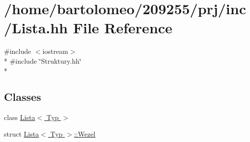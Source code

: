 \hypertarget{_lista_8hh}{\section{/home/bartolomeo/209255/prj/inc/\-Lista.hh File Reference}
\label{_lista_8hh}
}
{\ttfamily \#include $<$iostream$>$}\\*
{\ttfamily \#include \char`\"{}Struktury.\-hh\char`\"{}}\\*
\subsection*{Classes}
\begin{DoxyCompactItemize}
\item 
class \hyperlink{class_lista}{Lista$<$ Typ $>$}
\item 
struct \hyperlink{struct_lista_1_1_wezel}{Lista$<$ Typ $>$\-::\-Wezel}
\end{DoxyCompactItemize}

